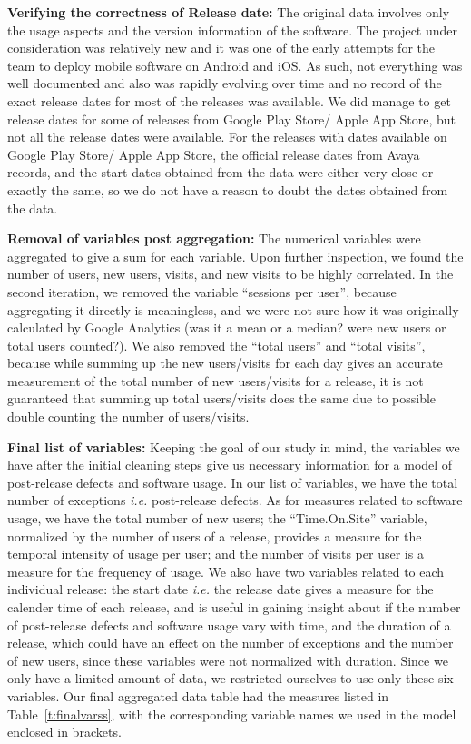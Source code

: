\documentclass[smallcondensed]{svjour3}     %
\begin{document}
\noindent
\textbf{Verifying the correctness of Release date:}
The original data involves only the usage aspects and the version
information of the software. The project under consideration was
relatively new and it was one of the early attempts for the team to deploy
mobile software on Android and iOS. As such, not everything
was well documented and also was rapidly evolving over time  and no
record of the exact release dates for most of the releases was
available. We did manage to get release dates for some of releases
from Google Play Store/ Apple App Store, but not all the release dates  were
available.  For the releases with dates available on Google Play
Store/ Apple App Store, the official release dates from Avaya records, and the start
dates obtained from the data were either very close or exactly the
same, so we do not have a reason to doubt the dates obtained from the
data. 

\noindent
\textbf{Removal  of variables post aggregation:}
The numerical variables were aggregated to give a sum for each
variable. Upon further inspection, we found the number of users, new
users, visits, and new visits to be highly correlated. In the second
iteration, we removed the variable ``sessions per user'', because
aggregating it directly is meaningless, and we were not sure how it
was originally calculated by Google Analytics (was it a mean or
a median? were new users or total users counted?). We also removed
the ``total users'' and ``total visits'', because while summing up the
new users/visits for each day gives an accurate measurement of the total
number of new users/visits for a release, it is not guaranteed that
summing up total users/visits does the same due to possible double
counting the number of users/visits. 

\noindent
\textbf{Final list of variables:}
Keeping the goal of our study in mind, the variables we have after the initial cleaning 
steps give us necessary information for a model of post-release defects and software usage.
In our list of variables, we have the total number of exceptions \textit{i.e.} post-release defects. 
As for measures related to software usage, we have the total number of new users;
the ``Time.On.Site'' variable, normalized by the number of users of a release,
provides a measure for the temporal intensity of usage per user;
and the number of visits per user is a measure for the frequency of usage.
We also have two variables related to each individual release: the start date \textit{i.e.} the release
date gives a measure for the calender time of each release, and is useful in gaining insight
about if the number of post-release defects and software usage vary with time, and 
the duration of a release, which could have an effect on the number of exceptions
and the number of new users, since these variables were not normalized with duration.
Since we only have a limited amount of data, we restricted ourselves to use only 
these six variables.
Our final aggregated data table had the measures listed in Table~\ref{t:finalvarss}, 
with the corresponding variable names we used in the model enclosed in brackets. 
\end{document}
